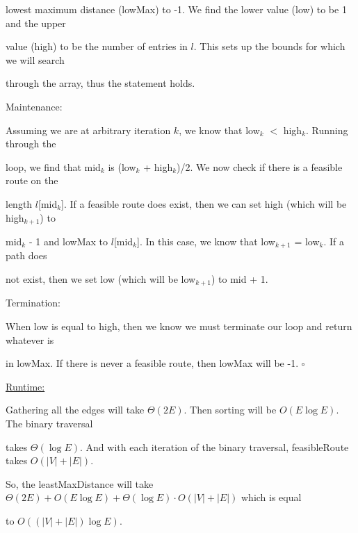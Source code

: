 \documentclass{article} %
\begin{document}
    \hspace{5pt} lowest maximum distance (lowMax) to -1. We find the lower value (low) to be 1 and the upper 
    
    \hspace{5pt} value (high) to be the number of entries in $l$. This sets up the bounds for which we will search 
    
    \hspace{5pt} through the array, thus the statement holds. 

    Maintenance:

    \hspace{5pt} Assuming we are at arbitrary iteration $k$, we know that low$_k$ $<$ high$_k$. Running through the 
    
    \hspace{5pt} loop, we find that mid$_k$ is (low$_k$ + high$_k$)/2. We now check if there is a feasible route on the 
    
    \hspace{5pt} length $l$[mid$_k$]. If a feasible route does exist, then we can set high (which will be high$_{k+1}$) to 
    
    \hspace{5pt} mid$_k$ - 1 and lowMax to $l$[mid$_k$]. In this case, we know that low$_{k+1}$ = low$_k$. If a path does 
    
    \hspace{5pt} not exist, then we set low (which will be low$_{k+1}$) to mid + 1.

    Termination:

    \hspace{5pt} When low is equal to high, then we know we must terminate our loop and return whatever is 
    
    \hspace{5pt} in lowMax. If there is never a feasible route, then lowMax will be -1. $\square$

    \underline{Runtime:}

    Gathering all the edges will take $\Theta(2E)$. Then sorting will be $O(E \log E)$. The binary traversal 
    
    takes $\Theta(\log E)$. And with each iteration of the binary traversal, feasibleRoute takes $O(|V|+|E|)$. 
    
    So, the leastMaxDistance will take $\Theta(2E) + O(E \log E) +  \Theta(\log E) \cdot O(|V|+|E|)$ which is equal 
    
    to $O((|V|+|E|) \log E)$. 
\end{document}
